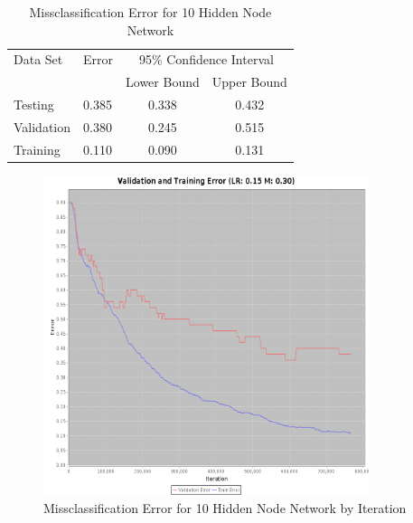 \documentclass{article}
\begin{document}
\begin{table}
\caption{Missclassification Error for 10 Hidden Node Network}
\begin{center}
\begin{tabular}{llcc}
\toprule
Data Set & Error & \multicolumn{2}{c}{95\% Confidence Interval} \\
\cmidrule(r){3-4}
& & Lower Bound & Upper Bound \\
\midrule
Testing       & 0.385 &  0.338 & 0.432  \\
Validation    & 0.380 &  0.245 & 0.515  \\
Training      & 0.110 &  0.090 & 0.131  \\
\bottomrule
\end{tabular}
\label{table10}
\end{center}
\end{table}

\begin{figure}
\centering
\includegraphics[width=0.85\textwidth]{data/final/10_hidden_nodes_error.png}
\caption{Missclassification Error for 10 Hidden Node Network by Iteration}
\label{error10}
\end{figure}
\end{document}
